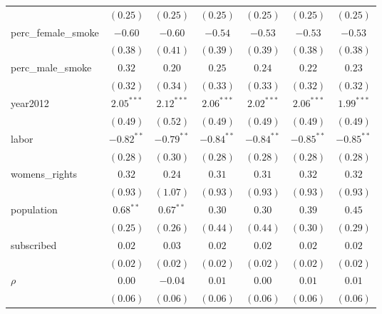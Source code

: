 \begin{table}[!h]
\begin{center}
\begin{tabular}{l c c c c c c }
                        & $(0.25)$     & $(0.25)$     & $(0.25)$     & $(0.25)$     & $(0.25)$     & $(0.25)$     \\
perc\_female\_smoke     & $-0.60$      & $-0.60$      & $-0.54$      & $-0.53$      & $-0.53$      & $-0.53$      \\
                        & $(0.38)$     & $(0.41)$     & $(0.39)$     & $(0.39)$     & $(0.38)$     & $(0.38)$     \\
perc\_male\_smoke       & $0.32$       & $0.20$       & $0.25$       & $0.24$       & $0.22$       & $0.23$       \\
                        & $(0.32)$     & $(0.34)$     & $(0.33)$     & $(0.33)$     & $(0.32)$     & $(0.32)$     \\
year2012                & $2.05^{***}$ & $2.12^{***}$ & $2.06^{***}$ & $2.02^{***}$ & $2.06^{***}$ & $1.99^{***}$ \\
                        & $(0.49)$     & $(0.52)$     & $(0.49)$     & $(0.49)$     & $(0.49)$     & $(0.49)$     \\
labor                   & $-0.82^{**}$ & $-0.79^{**}$ & $-0.84^{**}$ & $-0.84^{**}$ & $-0.85^{**}$ & $-0.85^{**}$ \\
                        & $(0.28)$     & $(0.30)$     & $(0.28)$     & $(0.28)$     & $(0.28)$     & $(0.28)$     \\
womens\_rights          & $0.32$       & $0.24$       & $0.31$       & $0.31$       & $0.32$       & $0.32$       \\
                        & $(0.93)$     & $(1.07)$     & $(0.93)$     & $(0.93)$     & $(0.93)$     & $(0.93)$     \\
population              & $0.68^{**}$  & $0.67^{**}$  & $0.30$       & $0.30$       & $0.39$       & $0.45$       \\
                        & $(0.25)$     & $(0.26)$     & $(0.44)$     & $(0.44)$     & $(0.30)$     & $(0.29)$     \\
subscribed              & $0.02$       & $0.03$       & $0.02$       & $0.02$       & $0.02$       & $0.02$       \\
                        & $(0.02)$     & $(0.02)$     & $(0.02)$     & $(0.02)$     & $(0.02)$     & $(0.02)$     \\
$\rho$                  & $0.00$       & $-0.04$      & $0.01$       & $0.00$       & $0.01$       & $0.01$       \\
                        & $(0.06)$     & $(0.06)$     & $(0.06)$     & $(0.06)$     & $(0.06)$     & $(0.06)$     \\

\end{tabular}
\end{center}
\end{table}
